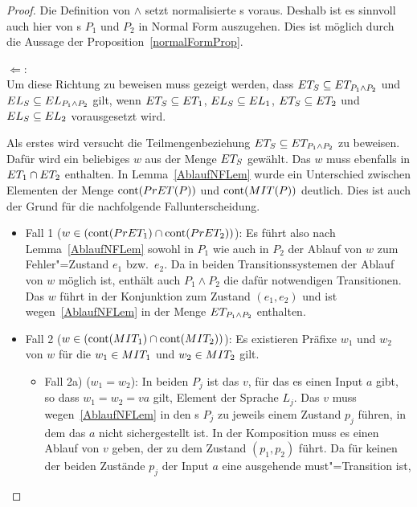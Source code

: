 \begin{proof}
  Die Definition von $\land$ setzt normalisierte \MEIO{}s voraus. Deshalb ist
  es sinnvoll auch hier von \MEIO{}s $P_1$ und $P_2$ in Normal Form auszugehen.
  Dies ist möglich durch die Aussage der Proposition~\ref{normalFormProp}.

  \glqq $\Leftarrow$\grqq{}:\\
  Um diese Richtung zu beweisen muss gezeigt werden, dass $ET _S \subseteq ET
  _{P_1\land P_2}$ und $EL _S \subseteq EL _{P_1\land P_2}$ gilt, wenn $ET
  _S \subseteq ET _1$, $EL _S \subseteq EL _1$, $ET _S \subseteq ET _2$
  und $EL _S \subseteq EL _2$ vorausgesetzt wird.

  Als erstes wird versucht die Teilmengenbeziehung $ET _S \subseteq ET
  _{P_1\land P_2}$ zu beweisen. Dafür wird ein beliebiges $w$ aus der Menge
  $ET _S$ gewählt. Das $w$ muss ebenfalls in $ET _1\cap ET _2$ enthalten. In
  Lemma~\ref{AblaufNFLem} wurde ein Unterschied zwischen Elementen der Menge
  $\mathrm{cont} (PrET (P))$ und $\mathrm{cont} (MIT (P))$ deutlich. Dies ist auch der Grund
  für die nachfolgende Fallunterscheidung.
  \begin{itemize}
    \item Fall 1 ($w\in(\mathrm{cont} (PrET _1)\cap \mathrm{cont}(PrET _2))$): Es führt also
      nach Lemma~\ref{AblaufNFLem} sowohl in $P_1$ wie auch in $P_2$ der Ablauf
      von $w$ zum Fehler"=Zustand $e_1$ bzw.\ $e_2$. Da in beiden
      Transitionssystemen der Ablauf von $w$ möglich ist, enthält auch
      $P_1\land P_2$ die dafür notwendigen Transitionen. Das $w$ führt in der
      Konjunktion zum Zustand $(e_1,e_2)$ und ist wegen~\ref{AblaufNFLem} in
      der Menge $ET _{P_1\land P_2}$ enthalten.
    \item Fall 2 ($w\in(\mathrm{cont} (MIT _1)\cap \mathrm{cont} (MIT _2))$): Es existieren
      Präfixe $w_1$ und $w_2$ von $w$ für die $w_1\in MIT _1$ und $w_2\in MIT
      _2$ gilt.
      \begin{itemize}
        \item Fall 2a) ($w_1=w_2$): In beiden $P_j$ ist das $v$, für das es
          einen Input $a$ gibt, so dass $w_1 = w_2 = va$ gilt, Element der
          Sprache $L_j$. Das $v$ muss wegen~\ref{AblaufNFLem} in den \MEIO{}s
          $P_j$ zu jeweils einem Zustand $p_j$ führen, in dem das $a$ nicht
          sichergestellt ist. In der Komposition muss es einen Ablauf von $v$
          geben, der zu dem Zustand $(p_1,p_2)$ führt. Da für keinen der beiden
          Zustände $p_j$ der Input $a$ eine ausgehende must"=Transition ist,

\end{itemize}
\end{itemize}
\end{proof}
